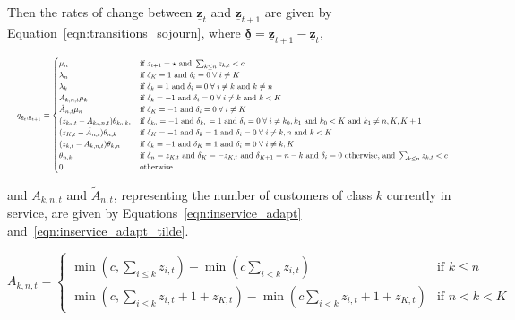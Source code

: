 \documentclass{article}
\begin{document}
Then the rates of change between $\underline{\mathbf{z}}_t$ and
$\underline{\mathbf{z}}_{t+1}$ are given by Equation~\ref{eqn:transitions_sojourn},
where $\underline{\mathbf{\delta}} = \underline{\mathbf{z}}_{t+1} - \underline{\mathbf{z}}_t$,

\begin{equation}\label{eqn:transitions_sojourn}
\resizebox{\textwidth}{!}{%
$q_{\underline{\mathbf{z}}_t, \underline{\mathbf{z}}_{t+1}} = 
\begin{cases}
\mu_n & \text{if } z_{t+1} = \star \text{ and } \sum_{k \leq n} z_{k, t} < c \\
\lambda_n & \text{if } \delta_K = 1 \text{ and } \delta_i = 0 \; \forall \; i \neq K \\
\lambda_k & \text{if } \delta_k = 1 \text{ and } \delta_i = 0 \; \forall \; i \neq k \text{ and } k \neq n\\
A_{k,n,t} \mu_k & \text{if } \delta_k = -1 \text{ and } \delta_i = 0 \; \forall \; i \neq k \text{ and } k < K\\
\tilde{A}_{n,t} \mu_n & \text{if } \delta_K = -1 \text{ and } \delta_i = 0 \; \forall \; i \neq K\\
(z_{k_0,t} - A_{k_0,n,t}) \theta_{k_0,k_1} & \text{if } \delta_{k_0} = -1 \text{ and } \delta_{k_1} = 1 \text{ and } \delta_i = 0 \; \forall \; i \neq k_0, k_1 \text{ and } k_0 < K \text{ and } k_1 \neq n, K, K+1 \\
(z_{K,t} - \tilde{A}_{n,t}) \theta_{n,k} & \text{if } \delta_K = -1 \text{ and } \delta_{k} = 1 \text{ and } \delta_i = 0 \; \forall \; i \neq k, n \text{ and } k < K \\
(z_{k,t} - A_{k,n,t}) \theta_{k,n} & \text{if } \delta_k = -1 \text{ and } \delta_K = 1 \text{ and } \delta_i = 0 \; \forall \; i \neq k, K \\
\theta_{n, k} & \text{if } \delta_n = z_{K,t} \text{ and } \delta_K = -z_{K,t} \text{ and } \delta_{K+1} = n - k \text{ and } \delta_i = 0 \text{ otherwise, and } \sum_{k \leq n} z_{k, t} < c \\
0 & \text{otherwise.}
\end{cases}$%
}
\end{equation}

and $A_{k,n,t}$ and $\tilde{A}_{n, t}$, representing the number of customers of
class $k$ currently in service, are given by Equations~\ref{eqn:inservice_adapt}
and~\ref{eqn:inservice_adapt_tilde}.

\begin{equation}\label{eqn:inservice_adapt}
A_{k,n,t} =
\begin{cases}
\min\left(c, \sum_{i \leq k} z_{i,t}\right) - \min\left(c \sum_{i < k} z_{i,t}\right) & \text{if } k \leq n \\
\min\left(c, \sum_{i \leq k} z_{i,t} + 1 + z_{K,t}\right) - \min\left(c \sum_{i < k} z_{i,t} + 1 + z_{K,t}\right) & \text{if } n < k < K
\end{cases}
\end{equation}
\end{document}
